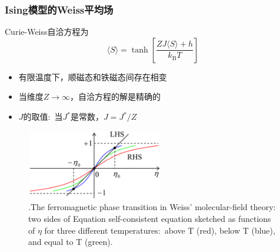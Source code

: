 \frame
{\frametitle{\textrm{Ising}模型的\textrm{Weiss}平均场}
\textrm{Curie-Weiss}自洽方程为
\begin{displaymath}
	\langle S\rangle=\tanh\left[\frac{ZJ\langle S\rangle+h}{k_{\mathrm{B}}T}\right]
\end{displaymath}
\begin{minipage}[t]{0.39\linewidth}
	\vspace*{-2in}
\begin{itemize}
		\setlength{\itemsep}{14pt}
	\item 有限温度下，顺磁态和铁磁态间存在相变
	\item 当维度$Z\rightarrow\infty$，自洽方程的解是精确的
	\item $J$的取值:~当$J^{\ast}$是常数，$J=J^{\ast}/Z$
\end{itemize}
\end{minipage}
\hfill
\begin{minipage}[b]{0.59\linewidth}
\begin{figure}[h!]
\centering
\includegraphics[height=1.2in,width=2.35in,viewport=0 0 1380 720,clip]{Figures/Ferromagnetic_phase_transition-in-Weiss_molecular-field-theory.png}
\caption{\textrm{\tiny .The ferromagnetic phase transition in Weiss' molecular-field theory: two sides of Equation self-consistent equation sketched as functions of $\eta$ for three different temperatures:~above T (red), below T (blue), and equal to T (green).}}%
\label{Ising-Model_Ferromagnetic_phase_transition}
\end{figure}
\end{minipage}
}

